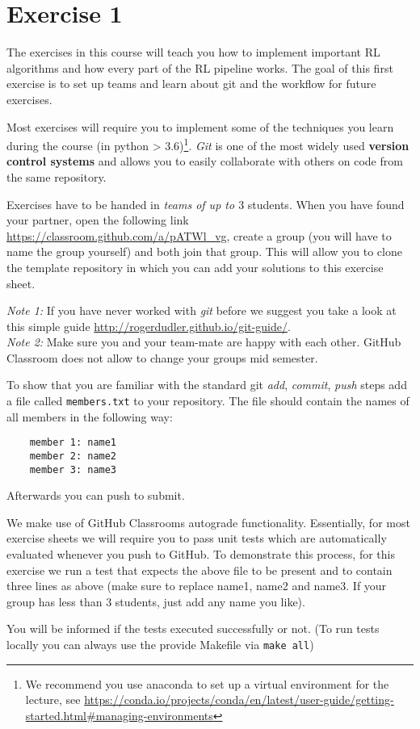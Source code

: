 \documentclass{exam}
\begin{document}
\section*{Exercise 1}

\noindent
The exercises in this course will teach you how to implement important RL algorithms and how every part of the RL pipeline works. The goal of this first exercise is to set up teams and learn about git and the workflow for future exercises.

\begin{questions}
	Most exercises will require you to implement some of the techniques you learn during the course (in python > 3.6)\footnote{We recommend you use anaconda to set up a virtual environment for the lecture, see \url{https://conda.io/projects/conda/en/latest/user-guide/getting-started.html\#managing-environments}}.
	\emph{Git} is one of the most widely used \textbf{version control systems} and allows you to easily collaborate with others on code from the same repository.
	
    Exercises have to be handed in \emph{teams of up to $3$} students.
    When you have found your partner, open the following link \url{https://classroom.github.com/a/pATWl_vg}, create a group (you will have to name the group yourself) and both join that group.
    This will allow you to clone the template repository in which you can add your solutions to this exercise sheet.

    \emph{Note 1:} If you have never worked with \emph{git} before we suggest you take a look at this simple guide \url{http://rogerdudler.github.io/git-guide/}.\\
    \emph{Note 2:} Make sure you and your team-mate are happy with each other. GitHub Classroom does not allow to change your groups mid semester. 
    
	
	To show that you are familiar with the standard git \emph{add}, \emph{commit}, \emph{push} steps add a file called \texttt{members.txt} to your repository.
	The file should contain the names of all members in the following way:
	\begin{verbatim}
	member 1: name1
	member 2: name2
	member 3: name3
	\end{verbatim}
	Afterwards you can push to submit.
	
	We make use of GitHub Classrooms autograde functionality. Essentially, for most exercise sheets we will require you to pass unit tests which are automatically evaluated whenever you push to GitHub.
	To demonstrate this process, for this exercise we run a test that expects the above file to be present and to contain three lines as above (make sure to replace name1, name2 and name3. If your group has less than 3 students, just add any name you like).

	You will be informed if the tests executed successfully or not.
	(To run tests locally you can always use the provide Makefile via \texttt{make all})
\end{questions}
\end{document}
